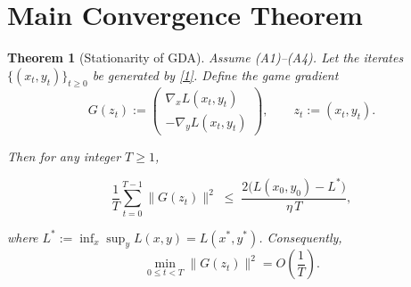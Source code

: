 \documentclass{article}
\newtheorem{theorem}{Theorem}
\begin{document}
\section*{Main Convergence Theorem}
\begin{theorem}[Stationarity of GDA]\label{thm:main}
Assume (A1)–(A4).  Let the iterates \(\{(x_t,y_t)\}_{t\ge0}\) be generated by \eqref{1}.  
Define the \emph{game gradient}
\[
G(z_t):=\begin{pmatrix}
\nabla_x L(x_t,y_t)\\[2pt]
-\nabla_y L(x_t,y_t)
\end{pmatrix},\qquad z_t:=(x_t,y_t).
\]

Then for any integer \(T\ge1\),

\[
\frac{1}{T}\sum_{t=0}^{T-1}\|G(z_t)\|^{2}
\;\le\;
\frac{2\bigl(L(x_0,y_0)-L^*\bigr)}{\eta\,T},
\tag{2}
\]

where \(L^*:=\inf_{x}\sup_{y}L(x,y)=L(x^*,y^*)\).  Consequently,
\[
\min_{0\le t<T}\|G(z_t)\|^{2}=O\!\left(\frac{1}{T}\right).
\]
\end{theorem}
\end{document}
